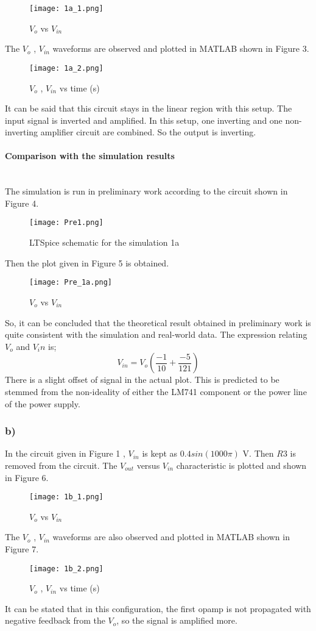 \documentclass[letterpaper,12pt]{article}
\begin{document}
\begin{figure}[H]
	\centering
   \texttt{[image: 1a\_1.png]}
   \caption{\(V_{o}\) vs \(V_{in}\)}
\end{figure}
The \(V_o\) , \(V_{in}\) waveforms are observed and plotted in MATLAB shown in Figure 3.
\begin{figure}[H]
	\centering
   \texttt{[image: 1a\_2.png]}
   \caption{\(V_{o}\) , \(V_{in}\) vs time (s) }
\end{figure}
It can be said that this circuit stays in the linear region with this setup. The input signal is inverted and amplified. In this setup, one inverting and one non-inverting amplifier circuit are combined. So the output is inverting. 
\paragraph{Comparison with the simulation results}
 \mbox{}
\\
The simulation is run in preliminary work according to the circuit shown in Figure 4.
\begin{figure}[H]
	\centering
   \texttt{[image: Pre1.png]}
   \caption{LTSpice schematic for the simulation 1a }
\end{figure}
Then the plot given in Figure 5 is obtained.
\begin{figure}[H]
	\centering
   \texttt{[image: Pre\_1a.png]}
   \caption{\(V_{o}\) vs \(V_{in}\)}
\end{figure}
So, it can be concluded that the theoretical result obtained in preliminary work is quite consistent with the simulation and real-world data. The expression relating \(V_o\) and \(V_in\) is;
\[V_{in} = V_o(\frac{-1}{10} + \frac{-5}{121})\]
There is a slight offset of signal in the actual plot. This is predicted to be stemmed from the non-ideality of either the LM741 component or the power line of the power supply.


\subsubsection{b)}
In the circuit given in Figure 1 , \(V_{in}\) is kept as \(0.4sin(1000\pi)\) V. Then \(R3\) is removed from the circuit. The \(V_{out}\) versus \(V_{in}\) characteristic is plotted and shown in Figure 6. 


\begin{figure}[H]
	\centering
   \texttt{[image: 1b\_1.png]}
   \caption{\(V_{o}\) vs \(V_{in}\)}
\end{figure}
The \(V_o\) , \(V_{in}\) waveforms are also observed and plotted in MATLAB shown in Figure 7.
\begin{figure}[H]
	\centering
   \texttt{[image: 1b\_2.png]}
   \caption{\(V_{o}\) , \(V_{in}\) vs time (s) }
\end{figure}
It can be stated that in this configuration, the first opamp is not propagated with negative feedback from the \(V_o\), so the signal is amplified more.  
\end{document}
